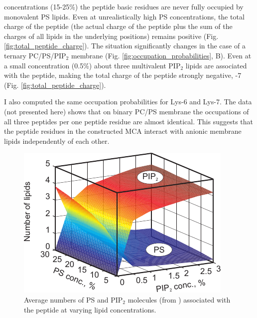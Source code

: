 concentrations (15-25\%) the peptide basic residues are never fully occupied by monovalent PS lipids. Even at unrealistically high PS concentrations, the total charge of the peptide (the actual charge of the peptide plus the sum of the charges of all lipids in the underlying positions) remains positive (Fig. \ref{fig:total_peptide_charge}).
The situation significantly changes in the case of a ternary PC/PS/PIP$_2$ membrane (Fig. \ref{fig:occupation_probabilities}, B). Even at a small concentration (0.5\%) about three multivalent PIP$_2$ lipids are associated with the peptide, making the total charge of the peptide strongly negative, -7 (Fig. \ref{fig:total_peptide_charge}).

I also computed the same occupation probabilities for Lys-6 and Lys-7. The data (not presented here) shows that on binary PC/PS membrane the occupations of all three peptides per one peptide residue are almost identical. This suggests that the peptide residues in the constructed MCA interact with anionic membrane lipids independently of each other.
\begin{figure}[!ht]
\begin{center}
  \includegraphics[scale=1.4]{../figures/ps_pip_competition.pdf}
\end{center}
 \caption[Average numbers of PS and PIP$_2$ molecules associated with the peptide]{Average numbers of PS and PIP$_2$ molecules (from \cite{Kiselev2011}) associated with the peptide at varying lipid concentrations.}
\label{fig:ps_pip_competition}
\end{figure}
